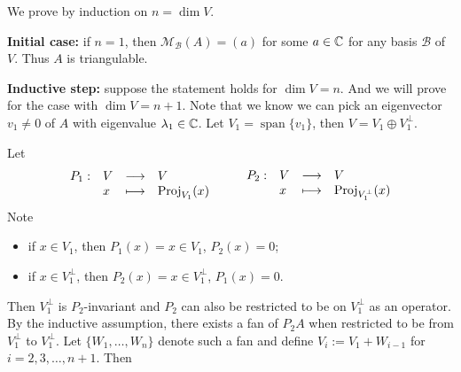 \begin{proofenv}
    We prove by induction on $n = \dim V$.

    \textbf{Initial case:} if $n=1$, then $\mathcal{M}_\mathcal{B}(A) = (a)$ for some $a\in \mathbb{C}$ for any basis $\mathcal{B}$ of $V$. Thus $A$ is triangulable.

    \textbf{Inductive step:} suppose the statement holds for $\dim V = n$. And we will prove for the case with $\dim V = n+1$. Note that we know we can pick an eigenvector $v_1 \ne 0$ of $A$ with eigenvalue $\lambda_1 \in \mathbb{C}$. Let $V_1 = \operatorname{span} \{ v_1 \}$, then $V = V_1 \oplus V_1^\perp$.

    Let
    $$\begin{array}{c l c l}
        P_1 : & V & \longrightarrow & V \\
        & x & \longmapsto & \operatorname{Proj}_{V_1} (x)
    \end{array}\qquad
    \begin{array}{c l c l}
        P_2 : & V & \longrightarrow & V \\
        & x & \longmapsto & \operatorname{Proj}_{V_1^\perp} (x)
    \end{array}
    $$
    Note
    \begin{itemize}
        \item if $x\in V_1$, then $P_1(x) = x \in V_1$, $P_2(x) = 0$;
        \item if $x\in V_1^\perp$, then $P_2(x) = x \in V_1^\perp$, $P_1(x) = 0$.
    \end{itemize}

    Then $V_1^\perp$ is $P_2$-invariant and $P_2$ can also be restricted to be on $V_1^\perp$ as an operator. By the inductive assumption, there exists a fan of $P_2 A$ when restricted to be from $V_1^\perp$ to $V_1^\perp$. Let $\{ W_1, \ldots, W_n \}$ denote such a fan and define $V_i := V_1 + W_{i-1}$ for $i=2,3,\ldots,n+1$. Then


\end{proofenv}
